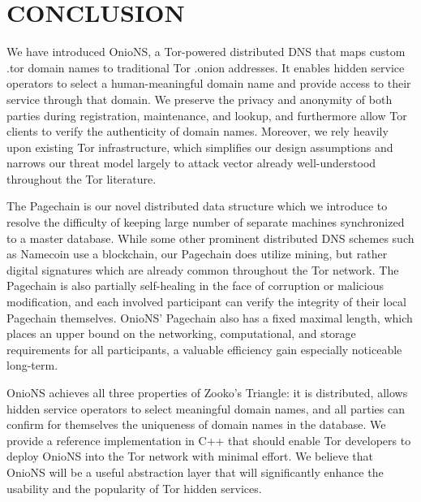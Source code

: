 
\chapter{CONCLUSION}

We have introduced OnioNS, a Tor-powered distributed DNS that maps custom .tor domain names to traditional Tor .onion addresses. It enables hidden service operators to select a human-meaningful domain name and provide access to their service through that domain. We preserve the privacy and anonymity of both parties during registration, maintenance, and lookup, and furthermore allow Tor clients to verify the authenticity of domain names. Moreover, we rely heavily upon existing Tor infrastructure, which simplifies our design assumptions and narrows our threat model largely to attack vector already well-understood throughout the Tor literature.

The Pagechain is our novel distributed data structure which we introduce to resolve the difficulty of keeping large number of separate machines synchronized to a master database. While some other prominent distributed DNS schemes such as Namecoin use a blockchain, our Pagechain does utilize mining, but rather digital signatures which are already common throughout the Tor network. The Pagechain is also partially self-healing in the face of corruption or malicious modification, and each involved participant can verify the integrity of their local Pagechain themselves. OnioNS' Pagechain also has a fixed maximal length, which places an upper bound on the networking, computational, and storage requirements for all participants, a valuable efficiency gain especially noticeable long-term.

OnioNS achieves all three properties of Zooko's Triangle: it is distributed, allows hidden service operators to select meaningful domain names, and all parties can confirm for themselves the uniqueness of domain names in the database. We provide a reference implementation in C++ that should enable Tor developers to deploy OnioNS into the Tor network with minimal effort. We believe that OnioNS will be a useful abstraction layer that will significantly enhance the usability and the popularity of Tor hidden services. 